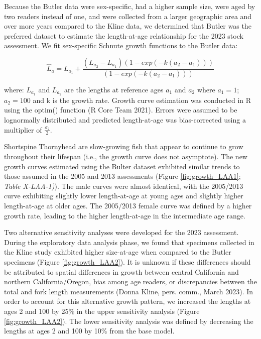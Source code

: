 \documentclass[11pt,
  english,
  letterpaper,
]{article}
\begin{document}
Because the Butler data were sex-specific, had a higher sample size, were aged by two readers instead of one, and were collected from a larger geographic area and over more years compared to the Kline data, we determined that Butler was the preferred dataset to estimate the length-at-age relationship for the 2023 stock assessment. We fit sex-specific Schnute growth functions to the Butler data:

\begin{equation} \hat{L}_{a} = L_{a_{1}}+\frac{(L_{a_{2}}-L_{a_{1}})(1-exp(-k(a_{2}-a_{1})))}{(1-exp(-k(a_{2}-a_{1})))}\end{equation}

where: \(L_{a_{1}}\) and \(L_{a_{2}}\) are the lengths at reference ages \(a_{1}\) and \(a_{2}\) where \(a_{1}=1\);\(a_{2}=100\) and k is the growth rate. Growth curve estimation was conducted in R using the optim() function (R Core Team 2021). Errors were assumed to be lognormally distributed and predicted length-at-age was bias-corrected using a multiplier of \(\frac{\sigma_2}{2}\).

Shortspine Thornyhead are slow-growing fish that appear to continue to grow throughout their lifespan (i.e., the growth curve does not asymptote). The new growth curves estimated using the Bulter dataset exhibited similar trends to those assumed in the 2005 and 2013 assessments (Figure \ref{fig:growth_LAA1}; \emph{\emph{Table X-LAA-1)}}). The male curves were almost identical, with the 2005/2013 curve exhibiting slightly lower length-at-age at young ages and slightly higher length-at-age at older ages. The 2005/2013 female curve was defined by a higher growth rate, leading to the higher length-at-age in the intermediate age range.

Two alternative sensitivity analyses were developed for the 2023 assessment. During the exploratory data analysis phase, we found that specimens collected in the Kline study exhibited higher size-at-age when compared to the Butler specimens (Figure \ref{fig:growth_LAA2}). It is unknown if these differences should be attributed to spatial differences in growth between central California and northern California/Oregon, bias among age readers, or discrepancies between the total and fork length measurements (Donna Kline, pers. comm., March 2023). In order to account for this alternative growth pattern, we increased the lengths at ages 2 and 100 by 25\% in the upper sensitivity analysis (Figure \ref{fig:growth_LAA2}). The lower sensitivity analysis was defined by decreasing the lengths at ages 2 and 100 by 10\% from the base model.
\end{document}

